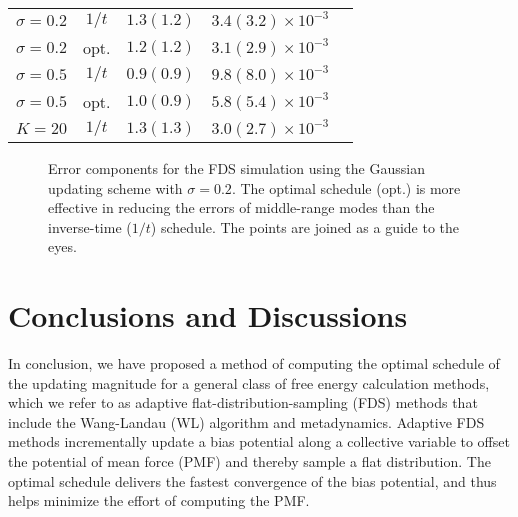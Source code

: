 \documentclass[reprint, superscriptaddress, floatfix]{revtex4-1}
\begin{document}
\begin{table}[h]
\begin{tabular} { l c c c c }
    $\sigma=0.2$ & $1/t$
    & $1.3(1.2)$
    & $3.4(3.2)\times10^{-3}$
    \\
    $\sigma=0.2$ & opt.
    & $1.2(1.2)$
    & $3.1(2.9)\times10^{-3}$
    \\
    $\sigma=0.5$ & $1/t$
    & $0.9(0.9)$
    & $9.8(8.0)\times10^{-3}$
    \\
    $\sigma=0.5$ & opt.
    & $1.0(0.9)$
    & $5.8(5.4)\times10^{-3}$
    \\
    $K=20$ & $1/t$
    & $1.3(1.3)$
    & $3.0(2.7)\times10^{-3}$
    \\
    \hline
  \end{tabular}
\end{table}



\begin{figure}[h]
\begin{center}
  \caption{
    \label{fig:lj_xerr}
    Error components for the FDS simulation
    using the Gaussian updating scheme with $\sigma = 0.2$.
    The optimal schedule (opt.) is more effective
    in reducing the errors of middle-range modes
    than the inverse-time ($1/t$) schedule.
    The points are joined as a guide to the eyes.
  }
\end{center}
\end{figure}











\section{\label{sec:conclusion}
Conclusions and Discussions}



In conclusion,
we have proposed a method of computing
the optimal schedule of the updating magnitude
for a general class of free energy calculation methods,
which we refer to as adaptive flat-distribution-sampling (FDS) methods
that include the Wang-Landau (WL) algorithm and metadynamics.
%
Adaptive FDS methods
incrementally update a bias potential
along a collective variable
to offset the potential of mean force (PMF)
and thereby sample a flat distribution.
%
The optimal schedule delivers the fastest convergence
of the bias potential,
and thus helps minimize the effort
of computing the PMF.
\end{document}
